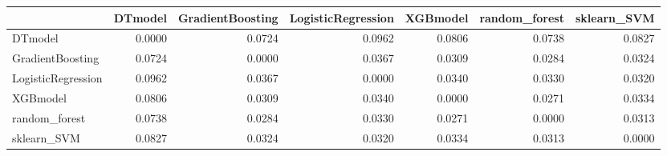\begin{tabular}{lrrrrrr}
\toprule
 & DTmodel & GradientBoosting & LogisticRegression & XGBmodel & random_forest & sklearn_SVM \\
\midrule
DTmodel & 0.0000 & 0.0724 & 0.0962 & 0.0806 & 0.0738 & 0.0827 \\
GradientBoosting & 0.0724 & 0.0000 & 0.0367 & 0.0309 & 0.0284 & 0.0324 \\
LogisticRegression & 0.0962 & 0.0367 & 0.0000 & 0.0340 & 0.0330 & 0.0320 \\
XGBmodel & 0.0806 & 0.0309 & 0.0340 & 0.0000 & 0.0271 & 0.0334 \\
random_forest & 0.0738 & 0.0284 & 0.0330 & 0.0271 & 0.0000 & 0.0313 \\
sklearn_SVM & 0.0827 & 0.0324 & 0.0320 & 0.0334 & 0.0313 & 0.0000 \\
\bottomrule
\end{tabular}
